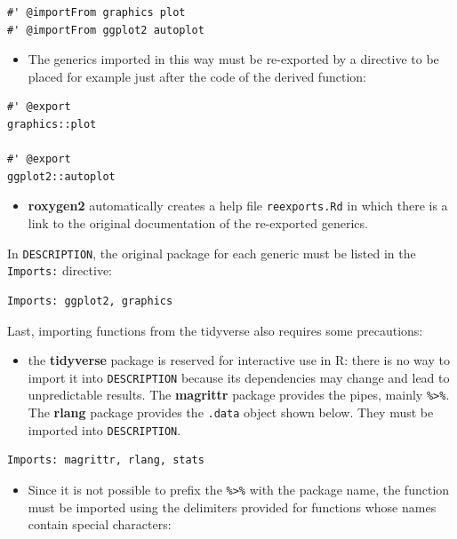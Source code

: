 \documentclass[
  12pt,
  american,
  a4paper,
  extrafontsizes,onecolumn,openright
  ]{memoir}
\providecommand{\tightlist}{%
  \setlength{\itemsep}{0pt}\setlength{\parskip}{0pt}}
\begin{document}
\begin{verbatim}
#' @importFrom graphics plot
#' @importFrom ggplot2 autoplot
\end{verbatim}

\begin{itemize}
\tightlist
\item
  The generics imported in this way must be re-exported by a directive to be placed for example just after the code of the derived function:
\end{itemize}

\begin{verbatim}
#' @export
graphics::plot

#' @export
ggplot2::autoplot
\end{verbatim}

\begin{itemize}
\tightlist
\item
  \textbf{roxygen2} automatically creates a help file \texttt{reexports.Rd} in which there is a link to the original documentation of the re-exported generics.
\end{itemize}

In \texttt{DESCRIPTION}, the original package for each generic must be listed in the \texttt{Imports:} directive:

\begin{verbatim}
Imports: ggplot2, graphics
\end{verbatim}

Last, importing functions from the tidyverse also requires some precautions:

\begin{itemize}
\tightlist
\item
  the \textbf{tidyverse} package is reserved for interactive use in R: there is no way to import it into \texttt{DESCRIPTION} because its dependencies may change and lead to unpredictable results.
  The \textbf{magrittr} package provides the pipes, mainly \texttt{\%\textgreater{}\%}.
  The \textbf{rlang} package provides the \texttt{.data} object shown below.
  They must be imported into \texttt{DESCRIPTION}.
\end{itemize}

\begin{verbatim}
Imports: magrittr, rlang, stats
\end{verbatim}

\begin{itemize}
\tightlist
\item
  Since it is not possible to prefix the \texttt{\%\textgreater{}\%} with the package name, the function must be imported using the delimiters provided for functions whose names contain special characters:
\end{itemize}
\end{document}
